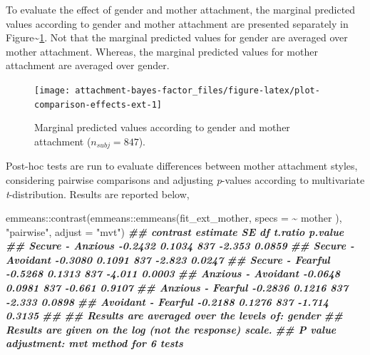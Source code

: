 \documentclass[
]{book}
\newenvironment{Shaded}{\begin{snugshade}}{\end{snugshade}}
\newcommand{\AttributeTok}[1]{\textcolor[rgb]{0.77,0.63,0.00}{#1}}
\newcommand{\DocumentationTok}[1]{\textcolor[rgb]{0.56,0.35,0.01}{\textbf{\textit{#1}}}}
\newcommand{\FunctionTok}[1]{\textcolor[rgb]{0.00,0.00,0.00}{#1}}
\newcommand{\NormalTok}[1]{#1}
\newcommand{\SpecialCharTok}[1]{\textcolor[rgb]{0.00,0.00,0.00}{#1}}
\newcommand{\StringTok}[1]{\textcolor[rgb]{0.31,0.60,0.02}{#1}}
\begin{document}
To evaluate the effect of gender and mother attachment, the marginal predicted values according to gender and mother attachment are presented separately in Figure\textasciitilde\ref{fig:plot-comparison-effects-ext}. Not that the marginal predicted values for gender are averaged over mother attachment. Whereas, the marginal predicted values for mother attachment are averaged over gender.

\begin{figure}

{\centering \texttt{[image: attachment-bayes-factor\_files/figure-latex/plot-comparison-effects-ext-1]} 

}

\caption{Marginal predicted values according to gender and mother attachment ($n_{subj} = 847$).}\label{fig:plot-comparison-effects-ext}
\end{figure}

Post-hoc tests are run to evaluate differences between mother attachment styles, considering pairwise comparisons and adjusting \emph{p}-values according to multivariate \emph{t}-distribution. Results are reported below,

\begin{Shaded}
\begin{Highlighting}[]
\NormalTok{emmeans}\SpecialCharTok{::}\FunctionTok{contrast}\NormalTok{(emmeans}\SpecialCharTok{::}\FunctionTok{emmeans}\NormalTok{(fit\_ext\_mother, }\AttributeTok{specs =} \SpecialCharTok{\textasciitilde{}}\NormalTok{ mother ),}
                  \StringTok{"pairwise"}\NormalTok{, }\AttributeTok{adjust =} \StringTok{"mvt"}\NormalTok{)}
\DocumentationTok{\#\#  contrast           estimate     SE  df t.ratio p.value}
\DocumentationTok{\#\#  Secure {-} Anxious    {-}0.2432 0.1034 837  {-}2.353  0.0859}
\DocumentationTok{\#\#  Secure {-} Avoidant   {-}0.3080 0.1091 837  {-}2.823  0.0247}
\DocumentationTok{\#\#  Secure {-} Fearful    {-}0.5268 0.1313 837  {-}4.011  0.0003}
\DocumentationTok{\#\#  Anxious {-} Avoidant  {-}0.0648 0.0981 837  {-}0.661  0.9107}
\DocumentationTok{\#\#  Anxious {-} Fearful   {-}0.2836 0.1216 837  {-}2.333  0.0898}
\DocumentationTok{\#\#  Avoidant {-} Fearful  {-}0.2188 0.1276 837  {-}1.714  0.3135}
\DocumentationTok{\#\# }
\DocumentationTok{\#\# Results are averaged over the levels of: gender }
\DocumentationTok{\#\# Results are given on the log (not the response) scale. }
\DocumentationTok{\#\# P value adjustment: mvt method for 6 tests}
\end{Highlighting}
\end{Shaded}
\end{document}
